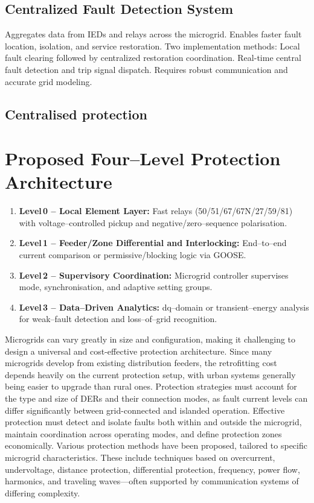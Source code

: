 \subsection{Centralized Fault Detection System}
Aggregates data from IEDs and relays across the microgrid.
Enables faster fault location, isolation, and service restoration.
Two implementation methods:
Local fault clearing followed by centralized restoration coordination.
Real-time central fault detection and trip signal dispatch.
Requires robust communication and accurate grid modeling.
\subsection{Centralised protection}



\section{Proposed Four–Level Protection Architecture}
\begin{enumerate}
    \item \textbf{Level\,0 – Local Element Layer:} Fast relays (50/51/67/67N/27/59/81) with voltage–controlled pickup and negative/zero–sequence polarisation.
    \item \textbf{Level\,1 – Feeder/Zone Differential and Interlocking:} End–to–end current comparison or permissive/blocking logic via GOOSE.
    \item \textbf{Level\,2 – Supervisory Coordination:} Microgrid controller supervises mode, synchronisation, and adaptive setting groups.
    \item \textbf{Level\,3 – Data–Driven Analytics:} dq–domain or transient–energy analysis for weak–fault detection and loss–of–grid recognition.
\end{enumerate}

Microgrids can vary greatly in size and configuration, making it challenging to design a universal and cost-effective protection architecture. Since many microgrids develop from existing distribution feeders, the retrofitting cost depends heavily on the current protection setup, with urban systems generally being easier to upgrade than rural ones.
Protection strategies must account for the type and size of DERs and their connection modes, as fault current levels can differ significantly between grid-connected and islanded operation. Effective protection must detect and isolate faults both within and outside the microgrid, maintain coordination across operating modes, and define protection zones economically.
Various protection methods have been proposed, tailored to specific microgrid characteristics. These include techniques based on overcurrent, undervoltage, distance protection, differential protection, frequency, power flow, harmonics, and traveling waves—often supported by communication systems of differing complexity.



